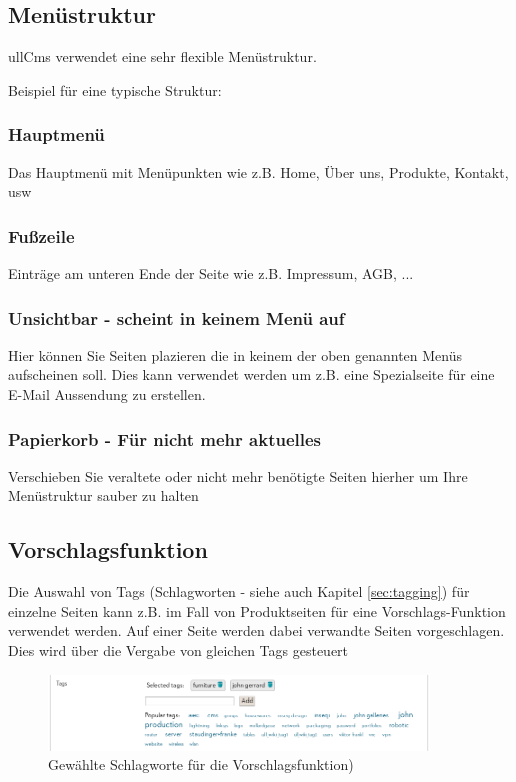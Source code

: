 \documentclass[article, a4paper, oneside, 11pt]{memoir}
\begin{document}
\subsection{Menüstruktur}

ullCms verwendet eine sehr flexible Menüstruktur. 

Beispiel für eine typische Struktur:

\subsubsection{Hauptmenü}

Das Hauptmenü mit Menüpunkten wie z.B. Home, Über uns, Produkte, Kontakt, usw


\subsubsection{Fußzeile}

Einträge am unteren Ende der Seite wie z.B. Impressum, AGB, ...

\subsubsection{Unsichtbar - scheint in keinem Menü auf}

Hier können Sie Seiten plazieren die in keinem der oben genannten Menüs aufscheinen soll. Dies kann verwendet werden um z.B. eine Spezialseite für eine E-Mail Aussendung zu erstellen.

\subsubsection{Papierkorb - Für nicht mehr aktuelles}

Verschieben Sie veraltete oder nicht mehr benötigte Seiten hierher um Ihre Menüstruktur sauber zu halten


\subsection{Vorschlagsfunktion}
\label{sec:recommendation}

Die Auswahl von Tags (Schlagworten - siehe auch Kapitel \vref{sec:tagging}) für einzelne Seiten kann z.B. im Fall von Produktseiten für eine Vorschlags-Funktion verwendet werden. Auf einer Seite werden dabei verwandte Seiten vorgeschlagen. Dies wird über die Vergabe von gleichen Tags gesteuert

\begin{figure}[htp]
\centering
\includegraphics[width=0.9\textwidth]{tagging}
\caption{Gewählte Schlagworte für die Vorschlagsfunktion)}
\label{fig:tagging2}
\end{figure}
\end{document}

